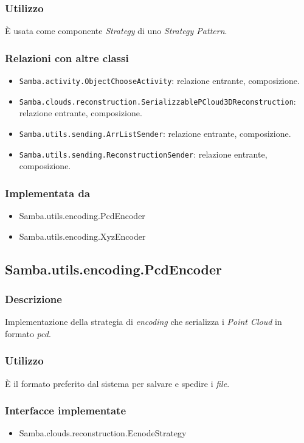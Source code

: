 \subsubsection{Utilizzo}
È usata come componente \emph{Strategy} di uno \emph{Strategy Pattern}.
\subsubsection{Relazioni con altre classi}
\begin{itemize}
	\item \texttt{Samba.activity.ObjectChooseActivity}: relazione entrante, composizione.
	\item \texttt{Samba.clouds.reconstruction.SerializzablePCloud3DReconstruction}: relazione entrante, composizione.
	\item \texttt{Samba.utils.sending.ArrListSender}: relazione entrante, composizione.
	\item \texttt{Samba.utils.sending.ReconstructionSender}: relazione entrante, composizione.	
\end{itemize}
\subsubsection{Implementata da}
\begin{itemize}
	\item Samba.utils.encoding.PcdEncoder
	\item Samba.utils.encoding.XyzEncoder
\end{itemize}

\subsection{Samba.utils.encoding.PcdEncoder}
\subsubsection{Descrizione}
Implementazione della strategia di \emph{encoding} che serializza i \emph{Point Cloud} in formato \emph{pcd}.
\subsubsection{Utilizzo}
È il formato preferito dal sistema per salvare e spedire i \emph{file}.
\subsubsection{Interfacce implementate}
\begin{itemize}
	\item Samba.clouds.reconstruction.EcnodeStrategy
\end{itemize}

